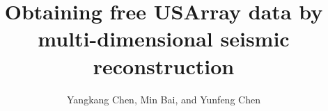 

%


\newcommand{\dlo}[1]{}
\newcommand{\wen}[1]{#1}




\title{Obtaining free USArray data by multi-dimensional seismic reconstruction}

\author{Yangkang Chen\footnotemark[1], Min Bai\footnotemark[2], and Yunfeng Chen\footnotemark[3]}

\renewcommand{\thefootnote}{\fnsymbol{footnote}}

\address{
\footnotemark[1]
School of Earth Sciences\\
Zhejiang University\\
Hangzhou, Zhejiang Province, China, 310027\\
yangkang.chen@zju.edu.cn \\
\footnotemark[2]
Key Laboratory of Exploration Technology for Oil\\
and Gas Resources of Ministry of Education\\
Yangtze University, Wuhan\\
Hubei Province, 430100, China\\
\footnotemark[3]Deep Earth Imaging\\
Future Science Platform\\
CSIRO, Kensington\\
WA, Australia, 6151
}




